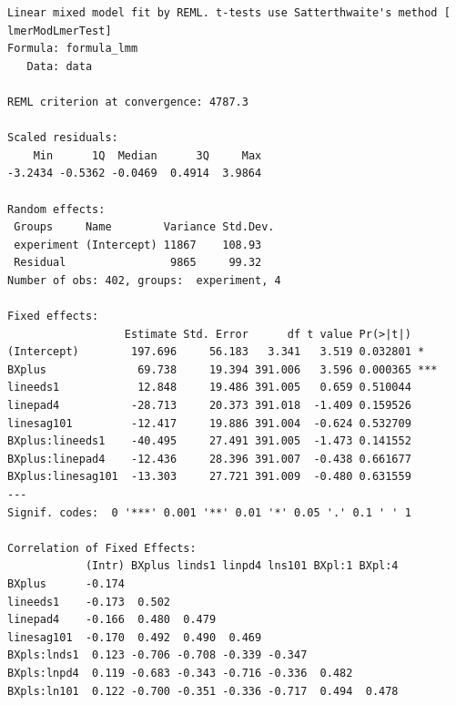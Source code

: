 \documentclass[
  10pt,
]{article}
\begin{document}
\begin{verbatim}
Linear mixed model fit by REML. t-tests use Satterthwaite's method [
lmerModLmerTest]
Formula: formula_lmm
   Data: data

REML criterion at convergence: 4787.3

Scaled residuals: 
    Min      1Q  Median      3Q     Max 
-3.2434 -0.5362 -0.0469  0.4914  3.9864 

Random effects:
 Groups     Name        Variance Std.Dev.
 experiment (Intercept) 11867    108.93  
 Residual                9865     99.32  
Number of obs: 402, groups:  experiment, 4

Fixed effects:
                  Estimate Std. Error      df t value Pr(>|t|)    
(Intercept)        197.696     56.183   3.341   3.519 0.032801 *  
BXplus              69.738     19.394 391.006   3.596 0.000365 ***
lineeds1            12.848     19.486 391.005   0.659 0.510044    
linepad4           -28.713     20.373 391.018  -1.409 0.159526    
linesag101         -12.417     19.886 391.004  -0.624 0.532709    
BXplus:lineeds1    -40.495     27.491 391.005  -1.473 0.141552    
BXplus:linepad4    -12.436     28.396 391.007  -0.438 0.661677    
BXplus:linesag101  -13.303     27.721 391.009  -0.480 0.631559    
---
Signif. codes:  0 '***' 0.001 '**' 0.01 '*' 0.05 '.' 0.1 ' ' 1

Correlation of Fixed Effects:
            (Intr) BXplus linds1 linpd4 lns101 BXpl:1 BXpl:4
BXplus      -0.174                                          
lineeds1    -0.173  0.502                                   
linepad4    -0.166  0.480  0.479                            
linesag101  -0.170  0.492  0.490  0.469                     
BXpls:lnds1  0.123 -0.706 -0.708 -0.339 -0.347              
BXpls:lnpd4  0.119 -0.683 -0.343 -0.716 -0.336  0.482       
BXpls:ln101  0.122 -0.700 -0.351 -0.336 -0.717  0.494  0.478
\end{verbatim}
\end{document}
